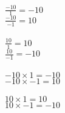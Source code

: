 \documentclass{article}
\begin{document}
$\frac{-10}{1}=-10$\\
$\frac{-10}{-1}=10$\\
\\$\frac{10}{1}=10$\\
$\frac{10}{-1}=-10$\\
\\$-10\times1=-10$\\
$-10\times-1=10$\\
\\$10\times1=10$\\
$10\times-1=-10$\\
\end{document}
